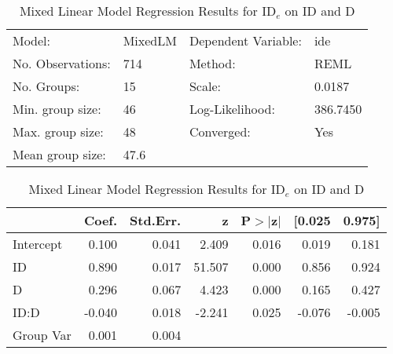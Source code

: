 \documentclass{article}
\begin{document}
	
	\begin{table}
		\caption{Mixed Linear Model Regression Results for ID$_e$ on ID and D}
		\label{tab:fit_jgp_ide_id_D}
		\begin{center}
			\begin{tabular}{llll}
				\hline
				Model:            & MixedLM & Dependent Variable: & ide       \\
				No. Observations: & 714     & Method:             & REML      \\
				No. Groups:       & 15      & Scale:              & 0.0187    \\
				Min. group size:  & 46      & Log-Likelihood:     & 386.7450  \\
				Max. group size:  & 48      & Converged:          & Yes       \\
				Mean group size:  & 47.6    &                     &           \\
				\hline
				\end{tabular}
				\end{center}
				
				\begin{center}
				\begin{tabular}{lrrrrrr}
				\hline
						  &  Coef. & Std.Err. &      z & P$> |$z$|$ & [0.025 & 0.975]  \\
				\hline
				Intercept &  0.100 &    0.041 &  2.409 &       0.016 &  0.019 &  0.181  \\
				ID        &  0.890 &    0.017 & 51.507 &       0.000 &  0.856 &  0.924  \\
				D         &  0.296 &    0.067 &  4.423 &       0.000 &  0.165 &  0.427  \\
				ID:D      & -0.040 &    0.018 & -2.241 &       0.025 & -0.076 & -0.005  \\
				Group Var &  0.001 &    0.004 &        &             &        &         \\
				\hline
				\end{tabular}
				\end{center}
				\end{table}
				
			


\end{document}
